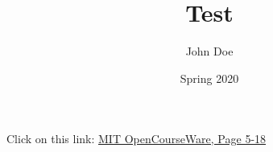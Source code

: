 \documentclass[12pt]{beamer}
\title{Test}                %
\author{John Doe }
\date{Spring 2020}                  %
\institute{John Doe University}
\begin{document}
 
    \setcounter{section}{5}
    \maketitle                  %
    \begin{frame}
        Click on this link: \href{https://ocw.mit.edu/courses/aeronautics-and-astronautics/16-323-principles-of-optimal-control-spring-2008/lecture-notes/lec5.pdf}{MIT OpenCourseWare, Page 5-18}
    \end{frame}
\end{document}
